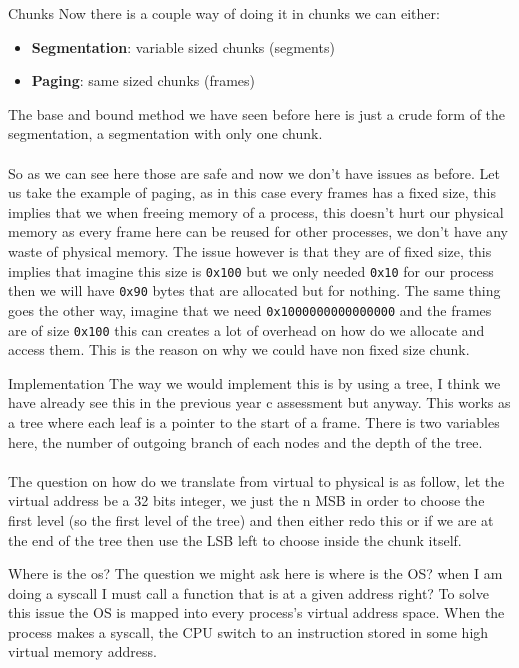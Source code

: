 \documentclass[a4paper]{book}
\begin{document}
\begin{parag}{Chunks}
    Now there is a couple way of doing it in chunks we can either:
	\begin{itemize}
	    \item \textbf{Segmentation}: variable sized chunks (segments)
	    \item \textbf{Paging}: same sized chunks (frames)
	\end{itemize}
	The base and bound method we have seen before here is just a crude form of the segmentation, a segmentation with only one chunk.\\
	$ $\\
	So as we can see here those are safe and now we don't have issues as before. Let us take the example of paging, as in this case every frames has a fixed size, this implies that we when freeing memory of a process, this doesn't hurt our physical memory as every frame here can be reused for other processes, we don't have any waste of physical memory. The issue however is that they are of fixed size, this implies that imagine this size is \texttt{0x100} but we only needed \texttt{0x10} for our process then we will have \texttt{0x90} bytes that are allocated but for nothing. The same thing goes the other way, imagine that we need \texttt{0x1000000000000000} and the frames are of size \texttt{0x100} this can creates a lot of overhead on how do we  allocate and access them. This is the reason on why we could have non fixed size chunk.
	\begin{subparag}{Implementation}
	    The way we would implement this is by using a tree, I think we have already see this in the previous year c assessment but anyway. This works as a tree where each leaf is a pointer to the start of a frame. There is two variables here, the number of outgoing branch of each nodes and the depth of the tree.\\
		$ $\\
		The question on how do we translate from virtual to physical is as follow, let the virtual address be a 32 bits integer, we just the n MSB in order to choose the first level (so the first level of the tree) and then either redo this or if we are at the end of the tree then use the LSB left to choose inside the chunk itself.
	\end{subparag}
\end{parag}


\begin{parag}{Where is the os?}
    The question we might ask here is where is the OS? when I am doing a syscall I must call a function that is at a given address right? To solve this issue the OS is mapped into every process's virtual address space. When the process makes a syscall, the CPU switch to an instruction stored in some high virtual memory address.
\end{parag}
\end{document}
